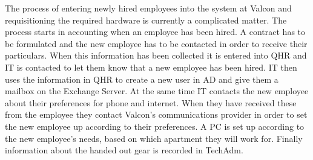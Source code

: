 The process of entering newly hired employees into the system at Valcon 
and requisitioning the required hardware is currently a complicated matter.
The process starts in accounting when an employee has been hired.
A contract has to be formulated and the new employee has to be contacted in order to receive their particulars.
When this information has been collected it is entered into QHR and IT is contacted to let them know that a new employee has been hired.
IT then uses the information in QHR to create a new user in AD and give them a mailbox on the Exchange Server.
At the same time IT contacts the new employee about their preferences for phone and internet.
When they have received these from the employee they contact Valcon's communications provider in order to set the new employee up according to their preferences.
A PC is set up according to the new employee's needs, based on which apartment they will work for.
Finally information about the handed out gear is recorded in TechAdm.

